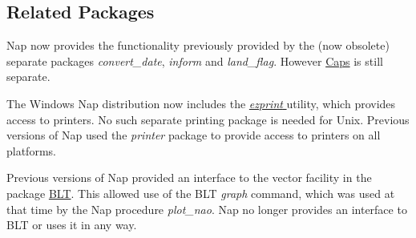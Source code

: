\subsection{Related Packages}
    \label{install-Related-Packages}

Nap now provides the functionality previously provided by the
  (now obsolete) separate packages 
  \emph{convert\_date}, 
  \emph{inform} and 
  \emph{land\_flag}. 
However 
\href{http://www.eoc.csiro.au/cats/caps/}{Caps}
is still separate.
  
 The Windows Nap distribution now includes the 
  \href{http://lbayuk.home.mindspring.com/ezprint/}{ \emph{ezprint} }
	utility, which provides access to printers. No such separate
  printing package is needed for Unix. Previous versions of Nap used
  the 
  \emph{printer} package to provide access to printers on all
  platforms.
  
 Previous versions of Nap provided an interface to the vector
  facility in the package 
  \href{http://sourceforge.net/projects/blt/}{BLT}. This allowed
  use of the BLT 
  \emph{graph} command, which was used at that time by the Nap
  procedure 
  \emph{plot\_nao}. Nap no longer provides an interface to BLT or uses
  it in any way.
